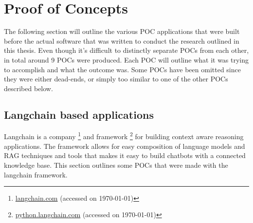 ﻿%










\section{Proof of Concepts}


The following section will outline the various \gls{POC} applications that were built before the actual software that was written to conduct the research outlined in this thesis. Even though it’s difficult to distinctly separate \gls{POC}s from each other, in total around 9 \gls{POC}s were produced. Each \gls{POC} will outline what it was trying to accomplish and what the outcome was. Some \gls{POC}s have been omitted since they were either dead-ends, or simply too similar to one of the other \gls{POC}s described below.


\subsection{Langchain based applications}


Langchain is a company \footnote{\href{https://langchain.com}{langchain.com} (accessed on \today)} and framework \footnote{\href{https://python.langchain.com}{python.langchain.com} (accessed on \today)} for building context aware reasoning applications. The framework allows for easy composition of language models and \gls{RAG} techniques and tools that makes it easy to build chatbots with a connected knowledge base. This section outlines some \gls{POC}s that were made with the langchain framework.



